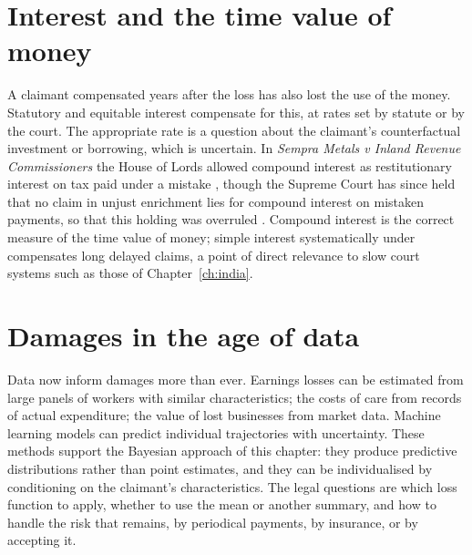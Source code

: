 \section{Interest and the time value of money}

A claimant compensated years after the loss has also lost the use of the money. Statutory and equitable interest compensate for this, at rates set by statute or by the court. The appropriate rate is a question about the claimant's counterfactual investment or borrowing, which is uncertain. In \emph{Sempra Metals v Inland Revenue Commissioners} the House of Lords allowed compound interest as restitutionary interest on tax paid under a mistake \citep{sempra2007}, though the Supreme Court has since held that no claim in unjust enrichment lies for compound interest on mistaken payments, so that this holding was overruled \citep{prudential2018}. Compound interest is the correct measure of the time value of money; simple interest systematically under compensates long delayed claims, a point of direct relevance to slow court systems such as those of Chapter~\ref{ch:india}.

\section{Damages in the age of data}

Data now inform damages more than ever. Earnings losses can be estimated from large panels of workers with similar characteristics; the costs of care from records of actual expenditure; the value of lost businesses from market data. Machine learning models can predict individual trajectories with uncertainty. These methods support the Bayesian approach of this chapter: they produce predictive distributions rather than point estimates, and they can be individualised by conditioning on the claimant's characteristics. The legal questions are which loss function to apply, whether to use the mean or another summary, and how to handle the risk that remains, by periodical payments, by insurance, or by accepting it.

